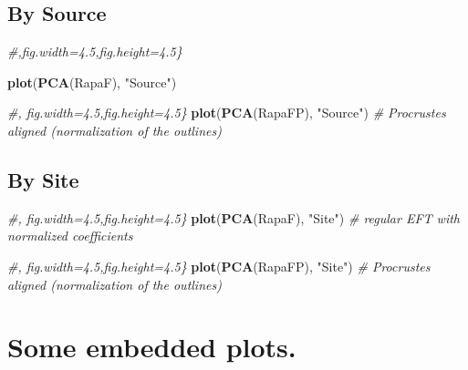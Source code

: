 \documentclass[]{article}
\newenvironment{Shaded}{\begin{snugshade}}{\end{snugshade}}
\newcommand{\KeywordTok}[1]{\textcolor[rgb]{0.13,0.29,0.53}{\textbf{{#1}}}}
\newcommand{\StringTok}[1]{\textcolor[rgb]{0.31,0.60,0.02}{{#1}}}
\newcommand{\CommentTok}[1]{\textcolor[rgb]{0.56,0.35,0.01}{\textit{{#1}}}}
\newcommand{\NormalTok}[1]{{#1}}
\begin{document}
\subsection{By Source}\label{by-source}

\begin{Shaded}
\begin{Highlighting}[]
\CommentTok{#,fig.width=4.5,fig.height=4.5\}}

\KeywordTok{plot}\NormalTok{(}\KeywordTok{PCA}\NormalTok{(RapaF), }\StringTok{"Source"}\NormalTok{)}
\end{Highlighting}
\end{Shaded}

\begin{Shaded}
\begin{Highlighting}[]
\CommentTok{#, fig.width=4.5,fig.height=4.5\}}
\KeywordTok{plot}\NormalTok{(}\KeywordTok{PCA}\NormalTok{(RapaFP), }\StringTok{"Source"}\NormalTok{) }\CommentTok{# Procrustes aligned (normalization of the outlines)}
\end{Highlighting}
\end{Shaded}

\subsection{By Site}\label{by-site}

\begin{Shaded}
\begin{Highlighting}[]
\CommentTok{#, fig.width=4.5,fig.height=4.5\}}
\KeywordTok{plot}\NormalTok{(}\KeywordTok{PCA}\NormalTok{(RapaF), }\StringTok{"Site"}\NormalTok{) }\CommentTok{# regular EFT with normalized coefficients}
\end{Highlighting}
\end{Shaded}

\begin{Shaded}
\begin{Highlighting}[]
\CommentTok{#, fig.width=4.5,fig.height=4.5\}}
\KeywordTok{plot}\NormalTok{(}\KeywordTok{PCA}\NormalTok{(RapaFP), }\StringTok{"Site"}\NormalTok{) }\CommentTok{# Procrustes aligned (normalization of the outlines)}
\end{Highlighting}
\end{Shaded}

\section{Some embedded plots.}\label{some-embedded-plots.}
\end{document}
